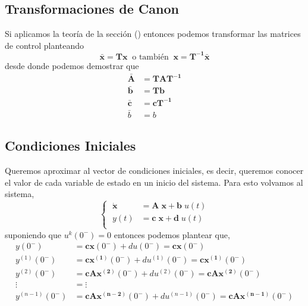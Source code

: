 \subsection{Transformaciones de Canon}
Si aplicamos la teoría de la sección () entonces podemos transformar
las matrices de control planteando
\begin{equation*}
    \bm{\bar{x}} = \bm{T} \bm{x} \; \; \text{o también} \; \;\bm{x} = \bm{T^{-1}} \bm{\bar{x}}
\end{equation*}
desde donde podemos demostrar que
\begin{equation*}
    \begin{split}
        \bm{\bar{A}} &= \bm{T} \bm{A} \bm{T^{-1}} \\
        \bm{\bar{b}} &= \bm{T} \bm{b} \\
        \bm{\bar{c}} &= \bm{c} \bm{T^{-1}} \\
        \bar{b} &= b
    \end{split}
\end{equation*}

\subsection{Condiciones Iniciales}
Queremos aproximar al vector de condiciones iniciales, es decir, queremos
conocer el valor de cada variable de estado en un inicio del sistema.
Para esto volvamos al sistema,
\begin{equation*}
    \begin{cases}
        \; \dot{\bm{x}} &= \bm{A} \; \bm{x} + \bm{b} \; u(t) \\
        \; y(t) &= \bm{c} \;\bm{x} + \bm{d} \; u(t) \\
    \end{cases}%
\end{equation*}
suponiendo que \( u^{k}(0^{-})=0 \) entonces podemos plantear que,
\begin{equation*}
    \begin{split}
        y(0^{-}) &= \bm{c} \bm{x}(0^{-}) + d u(0^{-}) = \bm{c} \bm{x}(0^{-}) \\
        y^{(1)}(0^{-}) &= \bm{c} \bm{x^{(1)}}(0^{-}) + d u^{(1)}(0^{-}) = \bm{c} \bm{x^{(1)}}(0^{-}) \\
        y^{(2)}(0^{-}) &= \bm{c} \bm{A} \bm{x^{(2)}}(0^{-}) + d u^{(2)}(0^{-}) = \bm{c} \bm{A} \bm{x^{(2)}}(0^{-}) \\
        \vdots &= \vdots \\
        y^{(n-1)}(0^{-}) &= \bm{c} \bm{A} \bm{x^{(n-2)}}(0^{-}) + d u^{(n-1)}(0^{-}) = \bm{c} \bm{A} \bm{x^{(n-1)}}(0^{-}) \\
    \end{split}
\end{equation*}










